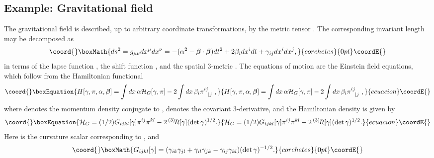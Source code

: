 \documentclass[a4paper,preprint, showpacs, aps, draft]{revtex4}
\begin{document}
{\subsection{Example: Gravitational field}

The gravitational field is described, up to arbitrary coordinate
transformations, by the metric tensor \coordHE{}.  The corresponding
invariant length may be decomposed as \cite{dw}
\[\coord{}\boxMath{
ds^2 = g_{\mu\nu}dx^\mu dx^\nu  = - (\alpha^2-{\bm \beta}\cdot {\bm \beta})dt^2
+ 2\beta_idx^idt+\gamma_{ij}dx^idx^j , }{corchetes}{0pt}\coordE{}\]
in terms of the lapse function \myHighlight{$\alpha$}\coordHE{}, the shift function \myHighlight{${\bm
\beta}$}\coordHE{}, and the spatial 3-metric \coordHE{}.  The
equations of motion are the Einstein field equations, which follow from
the Hamiltonian functional \cite{dw}
\begin{equation}\coord{}\boxEquation{ \label{hdw}
H[\gamma, \pi,\alpha,{\bm \beta}] = \int dx\, \alpha{\cal H}_G[\gamma, \pi] -
2\int dx\,\beta_i\pi^{ij}_{~~|j}~ ,
}{ H[\gamma, \pi,\alpha,{\bm \beta}] = \int dx\, \alpha{\cal H}_G[\gamma, \pi] -
2\int dx\,\beta_i\pi^{ij}_{~~|j}~ ,
}{ecuacion}\coordE{}\end{equation}
where \coordHE{} denotes the momentum density conjugate to
\myHighlight{$\gamma$}\coordHE{}, \coordHE{} denotes the covariant 3-derivative, and the Hamiltonian
density \coordHE{} is given by
\begin{equation}\coord{}\boxEquation{ \label{hg}
{\cal H}_G = 
(1/2) G_{ijkl}[\gamma]\pi^{ij}\pi^{kl} - 2\,
{}^{(3)}\!R[\gamma](\det\gamma)^{1/2} .
}{ {\cal H}_G = 
(1/2) G_{ijkl}[\gamma]\pi^{ij}\pi^{kl} - 2\,
{}^{(3)}\!R[\gamma](\det\gamma)^{1/2} .
}{ecuacion}\coordE{}\end{equation}
Here \coordHE{} is the curvature scalar corresponding to
\coordHE{}, and
\[\coord{}\boxMath{
G_{ijkl}[\gamma] =(\gamma_{ik}\gamma_{jl}+\gamma_{il}\gamma_{jk}
-\gamma_{ij}\gamma_{kl})(\det \gamma)^{-1/2} . }{corchetes}{0pt}\coordE{}\]

}
\end{document}
